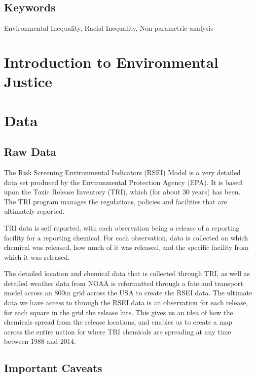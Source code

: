 \documentclass[12pt,twoside]{dukestatscithesis}
\theoremstyle{definition}
\theoremstyle{definition}
\theoremstyle{definition}
\theoremstyle{remark}
\begin{document}
\section{Keywords}\label{keywords}

Environmental Inequality, Racial Inequality, Non-parametric analysis

\chapter{Introduction to Environmental Justice}\label{rmd-basics}

\chapter{Data}\label{math}

\section{Raw Data}\label{raw-data}

The Risk Screening Environmental Indicators (RSEI) Model is a very
detailed data set produced by the Environmental Protection Agency (EPA).
It is based upon the Toxic Release Inventory (TRI), which (for about 30
years) has been. The TRI program manages the regulations, policies and
facilities that are ultimately reported.

TRI data is self reported, with each observation being a release of a
reporting facility for a reporting chemical. For each observation, data
is collected on which chemical was released, how much of it was
released, and the specific facility from which it was released.

The detailed location and chemical data that is collected through TRI,
as well as detailed weather data from NOAA is reformatted through a fate
and transport model across an 800m grid across the USA to create the
RSEI data. The ultimate data we have access to through the RSEI data is
an observation for each release, for each square in the grid the release
hits. This gives us an idea of how the chemicals spread from the release
locations, and enables us to create a map across the entire nation for
where TRI chemicals are spreading at any time between 1988 and 2014.

\section{Important Caveats}\label{important-caveats}
\end{document}
